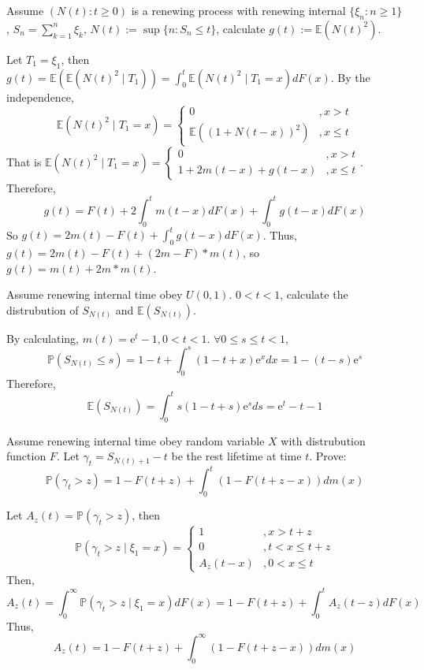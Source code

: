 \documentclass[../main]{subfiles}
\begin{document}
\begin{problem}\label{pro:1}
  Assume \((N(t):t \geq 0)\) is a renewing process with renewing internal
  \(\{\xi_n: n \geq 1\}\), \(S_n=\sum_{k=1}^{n} \xi_k\), \(N(t):=\sup \{n: S_n \leq t\}\), calculate \(g(t):=\mathbb{E}(N(t)^2)\).
\end{problem}
\begin{solution}
  Let \(T_1=\xi_1\), then \(g(t)=\mathbb{E}(\mathbb{E}(N(t)^2 \mid T_1))=\int_{0}^t \mathbb{E}(N(t)^2 \mid T_1=x)d F(x)\).
  By the independence, \[
    \mathbb{E}(N(t)^2 \mid T_1=x)=\begin{cases}
      0                          & , x > t    \\
      \mathbb{E}((1 + N(t-x))^2) & , x \leq t
    \end{cases}
  \]
  That is \(\mathbb{E}(N(t)^2 \mid T_1=x)=\begin{cases}
    0                    & ,x > t    \\
    1 + 2m(t-x) + g(t-x) & ,x \leq t
  \end{cases}\).
  Therefore,
  \[
    g(t)=F(t) + 2\int_{0}^t m(t-x)d F(x) + \int_{0}^t g(t-x)d F(x)
  \]
  So \(g(t)=2m(t)-F(t) + \int_{0}^t g(t-x)d F(x)\).
  Thus, \(g(t)=2m(t)-F(t) + (2m-F)*m(t)\), so \(g(t)=m(t) + 2m * m(t)\).
\end{solution}

\begin{problem}\label{pro:2}
  Assume renewing internal time obey \(U(0,1)\). \(0 < t< 1\), calculate the distrubution of \(S_{N(t)}\)
  and \(\mathbb{E}(S_{N(t)})\).
\end{problem}
\begin{solution}
  By calculating, \(m(t)=\mathrm{e}^t-1, 0 < t< 1\). \(\forall 0 \leq s \leq t <1\), \[
    \mathbb{P}(S_{N(t)}\leq s)=1-t + \int_{0}^s(1-t + x)\mathrm{e}^x dx=1-(t-s)\mathrm{e}^s
  \]
  Therefore, \[
    \mathbb{E}(S_{N(t)})=\int_{0}^t s(1-t + s)\mathrm{e}^s ds=\mathrm{e}^t -t -1
  \]
\end{solution}

\begin{problem}\label{pro:3}
  Assume renewing internal time obey random variable \(X\) with distrubution function \(F\).
  Let \(\gamma_t=S_{N(t) + 1}-t\) be the rest lifetime at time \(t\).
  Prove: \[
    \mathbb{P}(\gamma_t > z)=1-F(t + z) + \int_{0}^t(1-F(t + z -x))d m(x)
  \]
\end{problem}
\begin{solution}
  Let \(A_z(t)=\mathbb{P}(\gamma_t > z)\), then \[
    \mathbb{P}(\gamma_t > z \mid \xi_1=x)=\begin{cases}
      1        & ,x > t + z         \\
      0        & , t < x \leq t + z \\
      A_z(t-x) & , 0 < x \leq t
    \end{cases}
  \]
  Then,
  \[
    A_z(t)=\int_{0}^\infty \mathbb{P}(\gamma_t > z \mid \xi_1=x)d F(x)=1-F(t + z) + \int_{0}^tA_z(t-z)dF(x)
  \]
  Thus, \[
    A_z(t)=1-F(t + z) + \int_{0}^\infty(1-F(t + z -x))dm(x)
  \]
\end{solution}
\end{document}

